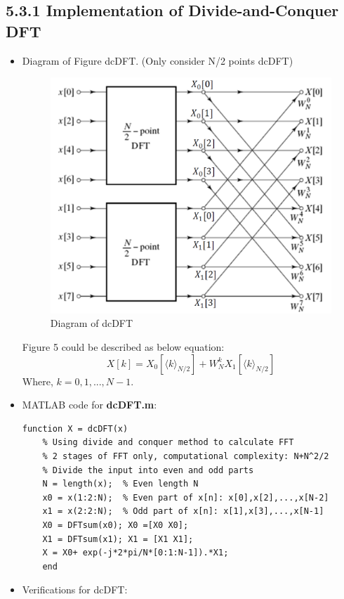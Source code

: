 \documentclass[onecolumn,oneside]{SUSTechHomework}
\begin{document}
\subsection*{5.3.1 Implementation of Divide-and-Conquer DFT}
\begin{itemize}
	\item Diagram of Figure dcDFT. (Only consider N/2 points dcDFT)
	\begin{figure}[H]
		\centering
		\includegraphics[width=130mm]{pictures/dcDFT.png}
		\caption{Diagram of dcDFT}
	\end{figure}
	Figure 5 could be described as below equation:
	\begin{equation}
		X[k]=X_{0}\left[\langle k\rangle_{N / 2}\right]+W_{N}^{k} X_{1}\left[\langle k\rangle_{N / 2}\right] \tag{Strategy 1}
	\end{equation}
	Where, $k=0,1,...,N-1 $.
	\item MATLAB code for \textbf{dcDFT.m}:
\begin{lstlisting}[title=\textbf{dcDFT.m}]
	function X = dcDFT(x)
	% Using divide and conquer method to calculate FFT
	% 2 stages of FFT only, computational complexity: N+N^2/2
	% Divide the input into even and odd parts
	N = length(x);  % Even length N
	x0 = x(1:2:N);  % Even part of x[n]: x[0],x[2],...,x[N-2]
	x1 = x(2:2:N);  % Odd part of x[n]: x[1],x[3],...,x[N-1]
	X0 = DFTsum(x0); X0 =[X0 X0];
	X1 = DFTsum(x1); X1 = [X1 X1];
	X = X0+ exp(-j*2*pi/N*[0:1:N-1]).*X1;
	end
\end{lstlisting}
	\item Verifications for dcDFT: \par

\end{itemize}
\end{document}
